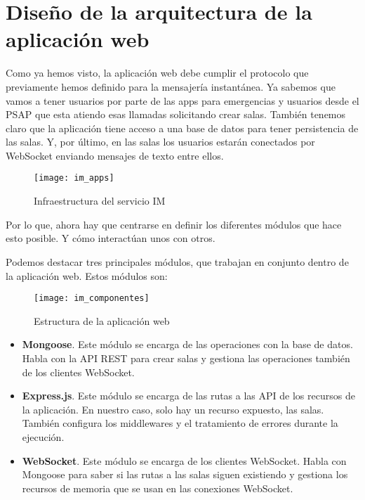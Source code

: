 \section{Diseño de la arquitectura de la aplicación web}

Como ya hemos visto, la aplicación web debe cumplir el protocolo que previamente hemos definido para la mensajería instantánea. Ya sabemos que vamos a tener usuarios por parte de las apps para emergencias y usuarios desde el PSAP que esta atiendo esas llamadas solicitando crear salas. También tenemos claro que la aplicación tiene acceso a una base de datos para tener persistencia de las salas. Y, por último, en las salas los usuarios estarán conectados por WebSocket enviando mensajes de texto entre ellos.

\begin{figure}[htp!]
  \centering
  \texttt{[image: im\_apps]}
  \caption{Infraestructura del servicio IM}
  \label{fig:im_apps}
\end{figure}

Por lo que, ahora hay que centrarse en definir los diferentes módulos que hace esto posible. Y cómo interactúan unos con otros.

Podemos destacar tres principales módulos, que trabajan en conjunto dentro de la aplicación web. Estos módulos son:

\begin{figure}[htp!]
  \centering
  \texttt{[image: im\_componentes]}
  \caption{Estructura de la aplicación web}
  \label{fig:im_componentes}
\end{figure}

\begin{itemize}
  \item \textbf{Mongoose}. Este módulo se encarga de las operaciones con la base de datos. Habla con la API REST para crear salas y gestiona las operaciones también de los clientes WebSocket.
  \item \textbf{Express.js}. Este módulo se encarga de las rutas a las API de los recursos de la aplicación. En nuestro caso, solo hay un recurso expuesto, las salas. También configura los middlewares y el tratamiento de errores durante la ejecución.
  \item \textbf{WebSocket}. Este módulo se encarga de los clientes WebSocket. Habla con Mongoose para saber si las rutas a las salas siguen existiendo y gestiona los recursos de memoria que se usan en las conexiones WebSocket.
\end{itemize}

